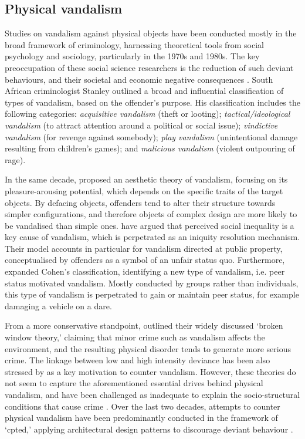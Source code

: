 \documentclass{article} \usepackage{graphicx,xspace}
\begin{document}
\subsection{Physical vandalism}

Studies on vandalism against physical objects have been conducted mostly in the broad framework of criminology, harnessing theoretical tools from social psychology and sociology, particularly in the 1970s and 1980s.
The key preoccupation of these social science researchers is the reduction of such deviant behaviours, and their societal and economic negative consequences \citep{goldstein:1996:psychology}. 
South African criminologist Stanley \cite{cohen:1973:property} outlined a broad and influential classification of types of vandalism, based on the offender's purpose. 
His classification includes the following categories:
\emph{acquisitive vandalism} (theft or looting);
\emph{tactical/ideological vandalism} (to attract attention around a political or social issue); 
\emph{vindictive vandalism} (for revenge against somebody);
\emph{play vandalism} (unintentional damage resulting from children's games); and
\emph{malicious vandalism} (violent outpouring of rage).

In the same decade, \cite{allen:1978:aesthetic} proposed an aesthetic theory of vandalism, focusing on its pleasure-arousing potential, which depends on the specific traits of the target objects.
By defacing objects, offenders tend to alter their structure towards simpler configurations, and therefore objects of complex design are more likely to be vandalised than simple ones.
\cite{fisher:1982:equity} have argued that perceived social inequality is a key cause of vandalism, which is perpetrated as an iniquity resolution mechanism.
Their model accounts in particular for vandalism directed at public property, conceptualised by offenders as a symbol of an unfair status quo.  
Furthermore, \cite{sutton:1987:differential} expanded Cohen's classification, identifying a new type of vandalism, i.e. peer status motivated vandalism.
Mostly conducted by groups rather than individuals, this type of vandalism is perpetrated to gain or maintain peer status, for example damaging a vehicle on a dare.

From a more conservative standpoint, \cite{kelling:1982:brokenwindow} outlined their widely discussed `broken window theory,' claiming that minor crime such as vandalism affects the environment, and the resulting physical disorder tends to generate more serious crime.
The linkage between low and high intensity deviance has been also stressed by \cite{goldstein:1996:psychology} as a key motivation to counter vandalism.
However, these theories do not seem to capture the aforementioned essential drives behind physical vandalism, and have been challenged as inadequate to explain the socio-structural conditions that cause crime \citep{gau:2010:revbrokenwindow}. 
Over the last two decades, attempts to counter physical vandalism have been predominantly conducted in the framework of `\gls{cpted},' applying architectural design patterns to discourage deviant behaviour \citep{cozens:2008:histcpted}.
\end{document}
